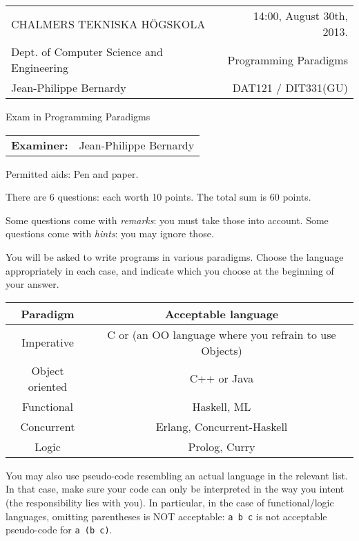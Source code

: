 \documentclass{article}
\begin{document}
\setlength{\parskip}{2pt}

\newcommand{\examtime}{14:00, August 30th, 2013}
\newcommand{\points}[1]{\marginpar{\bf #1 points}}
\noindent
\begin{tabular}{lr}
CHALMERS TEKNISKA H\"OGSKOLA &\examtime{}.\\
Dept. of Computer Science and Engineering & Programming Paradigms\\
Jean-Philippe Bernardy                 & DAT121 / DIT331(GU) \\
\end{tabular}

\vspace{2.5cm} \noindent
\begin{center} {\LARGE
Exam in Programming Paradigms}
\end{center}

\vspace{1.5cm}

\noindent
\begin{tabular}{ll}
\textbf{Examiner:} & Jean-Philippe Bernardy
\end{tabular}
\vspace{1cm}

\noindent
Permitted aids: Pen and paper.

There are 6 questions: each worth 10 points. The total sum is 60
points.

Some questions come with \emph{remarks}: you must take those
into account.  
Some questions come with \emph{hints}: you may ignore those.

You will be asked to write programs in various paradigms. Choose the
language appropriately in each case, and indicate which you choose at
the beginning of your answer.

\begin{tabular}[p]{cc}
  Paradigm & Acceptable language \\ \hline
  Imperative   & C or (an OO language where you refrain to use Objects) \\
  Object oriented & C++ or Java \\
  Functional & Haskell, ML \\
  Concurrent & Erlang, Concurrent-Haskell \\
  Logic & Prolog, Curry
\end{tabular}

You may also use pseudo-code resembling an actual language in the
relevant list. In that case, make sure your code can only be
interpreted in the way you intent (the responsibility lies with
you). In particular, in the case of functional/logic languages,
omitting parentheses is NOT acceptable: \texttt{a b c} is not
acceptable pseudo-code for \texttt{a (b c)}.
\end{document}
